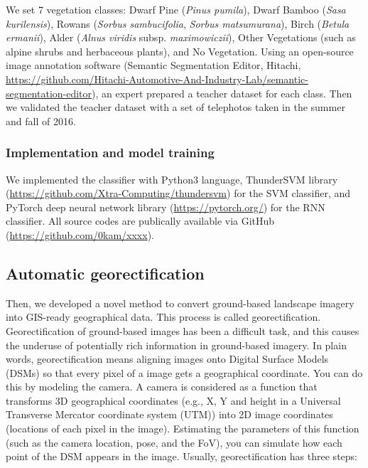 \documentclass{article}
\begin{document}
We set 7 vegetation classes: Dwarf Pine (\emph{Pinus pumila}), Dwarf Bamboo (\emph{Sasa kurilensis}), Rowans (\emph{Sorbus sambucifolia}, \emph{Sorbus matsumurana}), Birch (\emph{Betula ermanii}), Alder (\emph{Alnus viridis} subsp. \emph{maximowiczii}), Other Vegetations (such as alpine shrubs and herbaceous plants), and No Vegetation. Using an open-source image annotation software (Semantic Segmentation Editor, Hitachi, \url{https://github.com/Hitachi-Automotive-And-Industry-Lab/semantic-segmentation-editor}), an expert prepared a teacher dataset for each class. Then we validated the teacher dataset with a set of telephotos taken in the summer and fall of 2016.

\hypertarget{implementation-and-model-training}{%
\subsubsection{Implementation and model training}\label{implementation-and-model-training}}

We implemented the classifier with Python3 language, ThunderSVM library (\url{https://github.com/Xtra-Computing/thundersvm}) for the SVM classifier, and PyTorch deep neural network library (\url{https://pytorch.org/}) for the RNN classifier. All source codes are publically available via GitHub (\url{https://github.com/0kam/xxxx}).

\hypertarget{automatic-georectification}{%
\subsection{Automatic georectification}\label{automatic-georectification}}

Then, we developed a novel method to convert ground-based landscape imagery into GIS-ready geographical data. This process is called georectification. Georectification of ground-based images has been a difficult task, and this causes the underuse of potentially rich information in ground-based imagery. In plain words, georectification means aligning images onto Digital Surface Models (DSMs) so that every pixel of a image gets a geographical coordinate. You can do this by modeling the camera. A camera is considered as a function that transforms 3D geographical coordinates (e.g., X, Y and height in a Universal Transverse Mercator coordinate system (UTM)) into 2D image coordinates (locations of each pixel in the image). Estimating the parameters of this function (such as the camera location, pose, and the FoV), you can simulate how each point of the DSM appears in the image. Usually, georectification has three steps:
\end{document}
